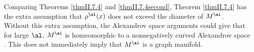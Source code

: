 \begin{remark}
  \label{rem:kl-thin-part-graph-manifold-positivity-thick-thin-geometry}

Comparing Theorems \ref{thmII.7.4} and \ref{thmII.7.4second},
Theorem \ref{thmII.7.4} has the extra assumption that
$\rho^\al(x)$ does not exceed the diameter of $M^\al$.
Without this extra assumption, the Alexandrov space arguments could give
that for large $\al$, $M^\al$ is homeomorphic to a nonnegatively curved
Alexandrov space \cite[Theorem 1.1(2)]{Shioya-Yamaguchi}. This does not
immediately imply that $M^\al$ is a graph manifold.
\end{remark}


